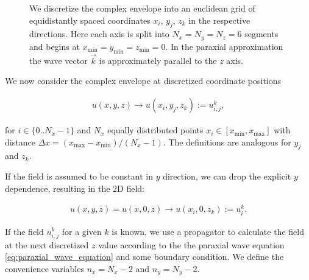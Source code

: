 
\label{sec:discretization}

\begin{figure}[!ht]
  \centering
  
  \caption{We discretize the complex envelope into an euclidean grid of equidistantly spaced coordinates $x_i$, $y_j$, $z_k$ in the respective directions. Here each axis is split into $N_x = N_y = N_z = 6$ segments and begins at $x_\mathrm{min} = y_\mathrm{min} = z_\mathrm{min} = 0$. In the paraxial approximation the wave vector $\vec k$ is approximately parallel to the $z$ axis.}
\end{figure}


We now consider the complex envelope at discretized coordinate positions

\begin{align*}
u(x,y,z) \rightarrow u(x_i,y_j,z_k) := u_{i,j}^k,
\end{align*}

for $i \in \{0..N_x-1\}$ and $N_x$ equally distributed points  $x_i \in [x_\mathrm{min},x_\mathrm{max}]$ with distance $\Delta x = (x_\mathrm{max} - x_\mathrm{min})/(N_x-1)$. The definitions are analogous for $y_j$ and $z_k$.

If the field is assumed to be constant in $y$ direction, we can drop the explicit $y$ dependence, resulting in the 2D field:

\begin{align*}
u(x,y,z) = u(x,0,z) \rightarrow u(x_i,0,z_k) := u_{i}^k.
\end{align*}

 If the field $u_{i,j}^k$ for a given $k$ is known, we use a propagator to calculate the field at the next discretized $z$ value according to the the paraxial wave equation \eqref{eq:paraxial_wave_equation} and some boundary condition. We define the convenience variables $n_x = N_x - 2$ and $n_y = N_y - 2$.
 